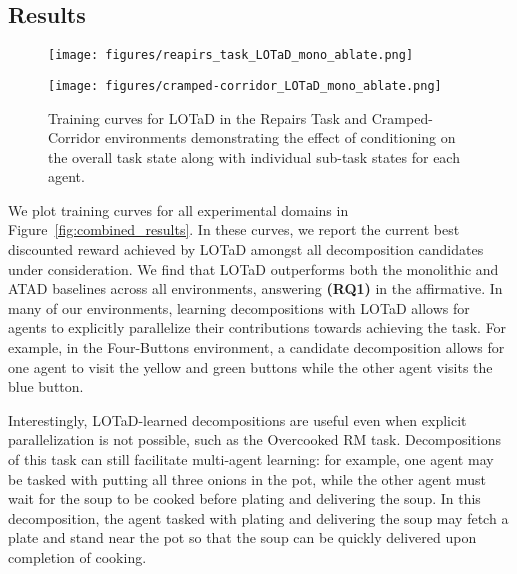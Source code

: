 \subsection{Results}

\begin{figure*}[t]
    \centering
    \begin{minipage}{0.48\textwidth}
        \centering
        \texttt{[image: figures/reapirs\_task\_LOTaD\_mono\_ablate.png]}
    \end{minipage}
    \hfill
    \begin{minipage}{0.48\textwidth}
        \centering
        \texttt{[image: figures/cramped-corridor\_LOTaD\_mono\_ablate.png]}
    \end{minipage}
    \caption{Training curves for LOTaD in the Repairs Task and Cramped-Corridor environments demonstrating the effect of conditioning on the overall task state along with individual sub-task states for each agent.}
    \label{fig:no_mono_ablation_curves}
\end{figure*}

We plot training curves for all experimental domains in Figure~\ref{fig:combined_results}. In these curves, we report the current best discounted reward achieved by LOTaD amongst all decomposition candidates under consideration. We find that LOTaD outperforms both the monolithic and ATAD baselines across all environments, answering \textbf{(RQ1)} in the affirmative. In many of our environments, learning decompositions with LOTaD allows for agents to explicitly parallelize their contributions towards achieving the task. For example, in the Four-Buttons environment, a candidate decomposition allows for one agent to visit the yellow and green buttons while the other agent visits the blue button. 

Interestingly, LOTaD-learned decompositions are useful even when explicit parallelization is not possible, such as the Overcooked RM task. Decompositions of this task can still facilitate multi-agent learning: for example, one agent may be tasked with putting all three onions in the pot, while the other agent must wait for the soup to be cooked before plating and delivering the soup. In this decomposition, the agent tasked with plating and delivering the soup may fetch a plate and stand near the pot so that the soup can be quickly delivered upon completion of cooking.

